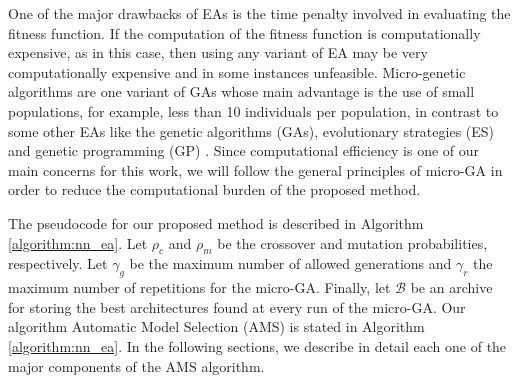 \documentclass[preprint,12pt]{elsarticle}%
\begin{document}
One of the major drawbacks of EAs is the time penalty involved in evaluating the fitness function. If the computation of the fitness function is computationally expensive, as in this case, then using any variant of EA may be very computationally expensive and in some instances unfeasible. Micro-genetic algorithms \cite{Krishnakumar1989} are one variant of GAs whose main advantage is the use of small populations, for example, less than 10 individuals per population, in contrast to some other EAs like the genetic algorithms (GAs), evolutionary strategies (ES) and genetic programming (GP) \cite{Engelbrecht2007}. Since computational efficiency is one of our main concerns for this work, we will follow the general principles of micro-GA in order to reduce the computational burden of the proposed method. 

The pseudocode for our proposed method is described in Algorithm \ref{algorithm:nn_ea}. Let $\rho_c$ and $\rho_m$ be the crossover and mutation probabilities, respectively. Let $\gamma_g$ be the maximum number of allowed generations and $\gamma_r$ the maximum number of repetitions for the micro-GA. Finally, let $\mathcal{B}$ be an archive for storing the best architectures found at every run of the micro-GA. Our algorithm Automatic Model Selection (AMS) is stated in Algorithm \ref{algorithm:nn_ea}. In the following sections, we describe in detail each one of the major components of the AMS algorithm.
\end{document}
